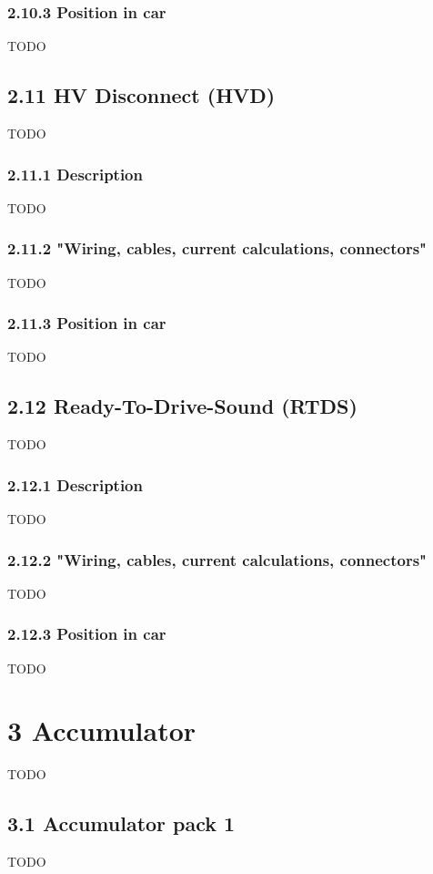 \documentclass{article}
\begin{document}
\subsubsection*{2.10.3 Position in car}
TODO

\subsection*{2.11 HV Disconnect (HVD)}
TODO

\subsubsection*{2.11.1 Description}
TODO

\subsubsection*{2.11.2 "Wiring, cables, current calculations, connectors"}
TODO

\subsubsection*{2.11.3 Position in car}
TODO

\subsection*{2.12 Ready-To-Drive-Sound (RTDS)}
TODO

\subsubsection*{2.12.1 Description}
TODO

\subsubsection*{2.12.2 "Wiring, cables, current calculations, connectors"}
TODO

\subsubsection*{2.12.3 Position in car}
TODO

\section*{3 Accumulator}
TODO

\subsection*{3.1 Accumulator pack 1}
TODO
\end{document}

